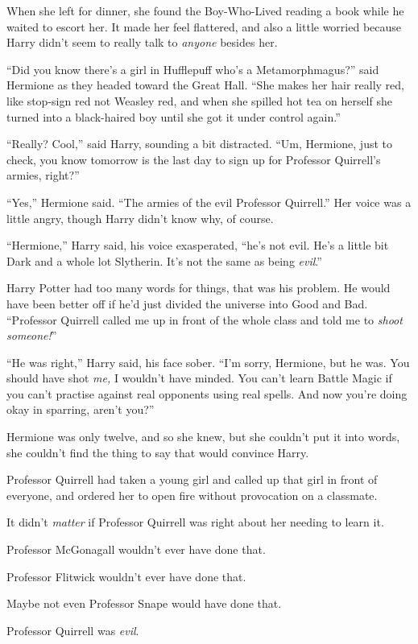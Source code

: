 When she left for dinner, she found the Boy-Who-Lived reading a book while he waited to escort her. It made her feel flattered, and also a little worried because Harry didn’t seem to really talk to \emph{anyone} besides her.

“Did you know there’s a girl in Hufflepuff who’s a Metamorphmagus?” said Hermione as they headed toward the Great Hall. “She makes her hair really red, like stop-sign red not Weasley red, and when she spilled hot tea on herself she turned into a black-haired boy until she got it under control again.”

“Really? Cool,” said Harry, sounding a bit distracted. “Um, Hermione, just to check, you know tomorrow is the last day to sign up for Professor Quirrell’s armies, right?”

“Yes,” Hermione said. “The armies of the evil Professor Quirrell.” Her voice was a little angry, though Harry didn’t know why, of course.

“Hermione,” Harry said, his voice exasperated, “he’s not evil. He’s a little bit Dark and a whole lot Slytherin. It’s not the same as being \emph{evil}.”

Harry Potter had too many words for things, that was his problem. He would have been better off if he’d just divided the universe into Good and Bad. “Professor Quirrell called me up in front of the whole class and told me to \emph{shoot someone!}”

“He was right,” Harry said, his face sober. “I’m sorry, Hermione, but he was. You should have shot \emph{me,} I wouldn’t have minded. You can’t learn Battle Magic if you can’t practise against real opponents using real spells. And now you’re doing okay in sparring, aren’t you?”

Hermione was only twelve, and so she knew, but she couldn’t put it into words, she couldn’t find the thing to say that would convince Harry.

Professor Quirrell had taken a young girl and called up that girl in front of everyone, and ordered her to open fire without provocation on a classmate.

It didn’t \emph{matter} if Professor Quirrell was right about her needing to learn it.

Professor McGonagall wouldn’t ever have done that.

Professor Flitwick wouldn’t ever have done that.

Maybe not even Professor Snape would have done that.

Professor Quirrell was \emph{evil}.

